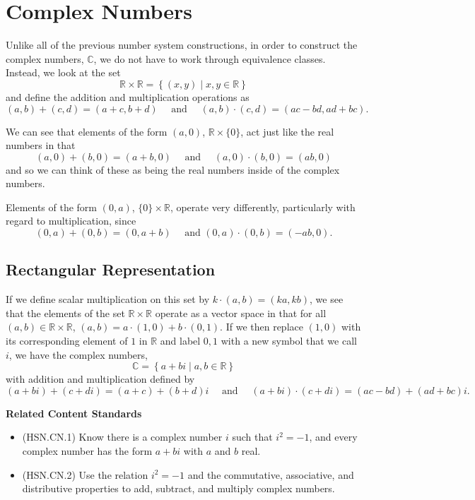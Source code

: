 \documentclass[
]{book}
\providecommand{\tightlist}{%
  \setlength{\itemsep}{0pt}\setlength{\parskip}{0pt}}
\newenvironment{standards}{}{}
\let\stdsection\section
\renewcommand\section{\newpage\stdsection}
\theoremstyle{definition}
\theoremstyle{definition}
\theoremstyle{definition}
\theoremstyle{definition}
\theoremstyle{remark}
\begin{document}
\hypertarget{complex}{%
\section{Complex Numbers}\label{complex}}

Unlike all of the previous number system constructions, in order to construct the complex numbers, \(\mathbb{C}\), we do not have to work through equivalence classes. Instead, we look at the set
\[\mathbb{R} \times \mathbb{R} = \left\{ (x,y) \middle \vert x,y \in \mathbb{R}\right\}\] and define the addition and multiplication operations as
\[(a,b) + (c,d) = (a+c, b+d) \quad \mbox{ and } \quad (a,b) \cdot (c,d) = (ac-bd, ad+bc).\]

We can see that elements of the form \((a,0)\), \(\mathbb{R}\times \{0\}\), act just like the real numbers in that \[(a,0)+(b,0)=(a+b,0) \quad \mbox{ and } \quad (a,0)\cdot (b,0) = (ab,0)\] and so we can think of these as being the real numbers inside of the complex numbers.

Elements of the form \((0,a)\), \(\{0\}\times \mathbb{R}\), operate very differently, particularly with regard to multiplication, since
\[(0,a)+(0,b)=(0,a+b) \quad \mbox{ and }  (0,a) \cdot (0,b) = (-ab,0).\]

\hypertarget{rectangular-representation}{%
\subsection{Rectangular Representation}\label{rectangular-representation}}

If we define scalar multiplication on this set by \(k \cdot (a,b) = (ka,kb)\), we see that the elements of the set \(\mathbb{R} \times \mathbb{R}\) operate as a vector space in that for all \((a,b) \in \mathbb{R}\times \mathbb{R}\), \((a,b) = a \cdot (1,0) + b \cdot (0,1)\). If we then replace \((1,0)\) with its corresponding element of \(1\) in \(\mathbb{R}\) and label \(0,1\) with a new symbol that we call \(i\), we have the complex numbers, \[\mathbb{C} = \left\{ a+bi\middle \vert a, b\in \mathbb{R}\right\}\] with addition and multiplication defined by
\[(a+bi) + (c+di) = (a+c) + (b+d)i \quad \mbox{ and } \quad (a+bi) \cdot (c+di) = (ac-bd) + (ad+bc)i.\]

\begin{standards}

\begin{center}
\textbf{Related Content Standards}

\end{center}

\begin{itemize}
\tightlist
\item
  (HSN.CN.1) Know there is a complex number \(i\) such that \(i^2 = -1\), and every complex number has the form \(a + bi\) with \(a\) and \(b\) real.
\item
  (HSN.CN.2) Use the relation \(i^2 = -1\) and the commutative, associative, and distributive properties to add, subtract, and multiply complex numbers.\\
\end{itemize}

\end{standards}
\end{document}
